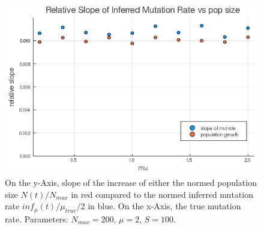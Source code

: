 \documentclass{article}
\numberwithin{equation}{subsection}
\begin{document}
	
	
	\begin{figure}[h!]
		\centering
		\includegraphics[width=\linewidth]{LogLinInfMutRate_N200_t50.png}
		
		\caption{On the y-Axis, slope of the increase of either the normed population size $N(t)/N_{max}$ in red compared to the normed inferred mutation rate $ inf_\mu(t)/\mu_{true}/2$ in blue. On the x-Axis, the true mutation rate. Parameters: $ N_{max} = 200$, $\mu = 2 $, $ S = 100 $.}
		\label{fig::NMutsInf}
	\end{figure}
\end{document}
